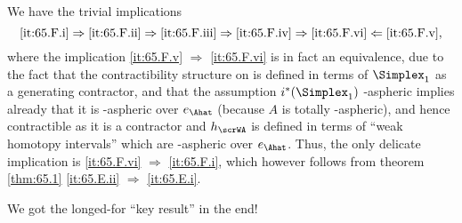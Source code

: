 We have the trivial implications
\[ \text{\ref{it:65.F.i}}
\Rightarrow \text{\ref{it:65.F.ii}}
\Rightarrow \text{\ref{it:65.F.iii}}
\Rightarrow \text{\ref{it:65.F.iv}}
\Rightarrow \text{\ref{it:65.F.vi}}
\Leftarrow \text{\ref{it:65.F.v}},\]
where the implication \ref{it:65.F.v} $\Rightarrow$ \ref{it:65.F.vi}
is in fact an equivalence, due to the fact that the contractibility
structure on \Cat{} is defined in terms of $\Simplex_1$ as a generating
contractor, and that the assumption $i^*(\Simplex_1)$ \scrW-aspheric
implies already that it is \scrWA-aspheric over $e_\Ahat$ (because $A$
is totally \scrWA-aspheric), and hence contractible as it is a
contractor and $h_\scrWA$ is defined in terms of ``weak homotopy
intervals'' which are \scrWA-aspheric over $e_\Ahat$. Thus, the only
delicate implication is \ref{it:65.F.vi} $\Rightarrow$
\ref{it:65.F.i}, which however follows from theorem \ref{thm:65.1}
\ref{it:65.E.ii} $\Rightarrow$ \ref{it:65.E.i}.

We got the longed-for ``key result'' in the end!

\bigbreak

\presectionfill{}\par


